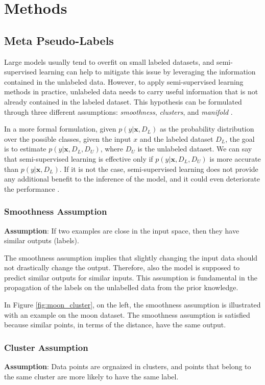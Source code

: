 \chapter{Methods}

\section{Meta Pseudo-Labels}
Large models usually tend to overfit on 
small labeled datasets, and semi-supervised learning can help to mitigate this 
issue by leveraging the information contained in the unlabeled data.
However, to apply semi-supervised learning methods in practice, unlabeled data 
needs to carry useful information that is not already contained in the labeled 
dataset. This hypothesis can be formulated through three different assumptions: 
\emph{smoothness}, \emph{clusters}, and \emph{manifold} 
\cite{chapelle2010semi}.

In a more formal formulation, given $p(y|\bm{x}, D_L)$ as the probability 
distribution over the possible classes, given the input $x$ and the labeled 
dataset $D_L$, the goal is to estimate $p(y|\bm{x}, D_L, D_U)$, where $D_U$ is the 
unlabeled dataset. We can say that semi-supervised learning is effective only if 
$p(y|\bm{x}, D_L, D_U)$ is more accurate than $p(y|\bm{x}, D_L)$. If it is not 
the case, semi-supervised learning does not provide any additional benefit to 
the inference of the model, and it could even deteriorate the performance 
\cite{chapelle2010semi}.

\subsection{Smoothness Assumption}
\textbf{Assumption}: If two examples are close in the input space, then they 
have similar outputs (labels).

The smoothness assumption implies that slightly changing the input data should 
not drastically change the output. Therefore, also the model is supposed to 
predict similar outputs for similar inputs. This assumption is fundamental in 
the propagation of the labels on the unlabelled data from the prior knowledge.

In Figure \ref{fig:moon_cluster}, on the left, the smoothness assumption is 
illustrated with an example on the moon dataset. The smoothness assumption 
is satisfied because similar points, in terms of the distance, have the same 
output.

\subsection{Cluster Assumption}
\textbf{Assumption}: Data points are orgnaized in clusters, and points that 
belong to the same cluster are more likely to have the same label.


